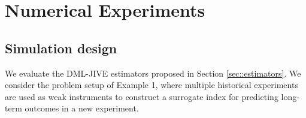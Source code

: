 \documentclass[11pt]{article}
\theoremstyle{plain}
\theoremstyle{definition}
\theoremstyle{remark}
\theoremstyle{definition}
\begin{document}



  

\section{Numerical Experiments}




\subsection{Simulation design}

 

We evaluate the DML-JIVE estimators proposed in Section \ref{sec::estimators}. We consider the problem setup of Example 1, where multiple historical experiments are used as weak instruments to construct a surrogate index for predicting long-term outcomes in a new experiment.


 
\end{document}
